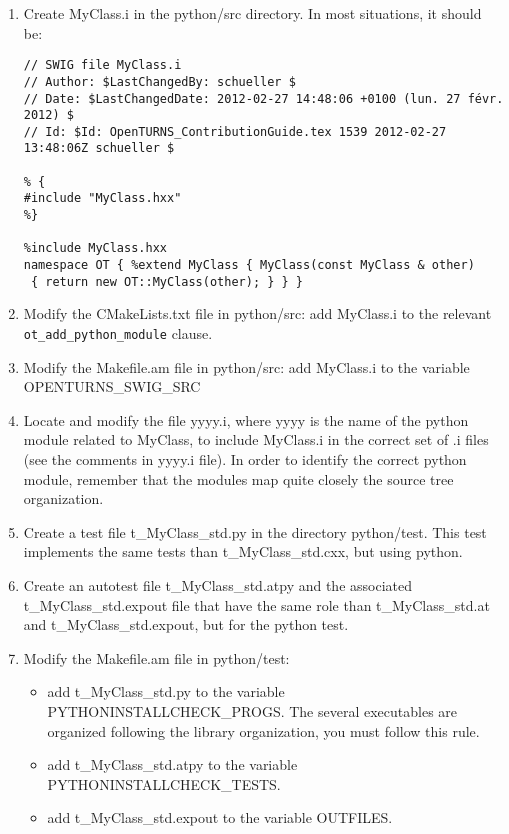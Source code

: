 \documentclass[11pt]{article}
\begin{document}
\begin{enumerate}
  \setcounter{enumi}{\value{oldenumi}}
\item Create MyClass.i in the python/src directory. In most situations, it should be:
\begin{verbatim}
// SWIG file MyClass.i
// Author: $LastChangedBy: schueller $
// Date: $LastChangedDate: 2012-02-27 14:48:06 +0100 (lun. 27 févr. 2012) $
// Id: $Id: OpenTURNS_ContributionGuide.tex 1539 2012-02-27 13:48:06Z schueller $

% {
#include "MyClass.hxx"
%}

%include MyClass.hxx
namespace OT { %extend MyClass { MyClass(const MyClass & other)
 { return new OT::MyClass(other); } } }
\end{verbatim}

\item Modify the CMakeLists.txt file in python/src: add MyClass.i to the relevant \verb!ot_add_python_module! clause.

\item Modify the Makefile.am file in python/src: add MyClass.i to the variable OPENTURNS\_SWIG\_SRC

\item Locate and modify the file yyyy.i, where yyyy is the name of the python module related to MyClass, to include MyClass.i in the correct set of .i files (see the comments in yyyy.i file). In order to identify the correct python module, remember that the modules map quite closely the source tree organization.

\item Create a test file t\_MyClass\_std.py in the directory python/test. This test implements the same tests than t\_MyClass\_std.cxx, but using python.

\item Create an autotest file t\_MyClass\_std.atpy and the associated t\_MyClass\_std.expout file that have the same role than t\_MyClass\_std.at and t\_MyClass\_std.expout, but for the python test.

\item Modify the Makefile.am file in python/test:
  \begin{itemize}
  \item add t\_MyClass\_std.py to the variable PYTHONINSTALLCHECK\_PROGS. The several executables are organized following the library organization, you must follow this rule.
  \item add t\_MyClass\_std.atpy to the variable PYTHONINSTALLCHECK\_TESTS.
  \item add t\_MyClass\_std.expout to the variable OUTFILES.
  \end{itemize}
  \setcounter{oldenumi}{\value{enumi}}
\end{enumerate}
\end{document}
